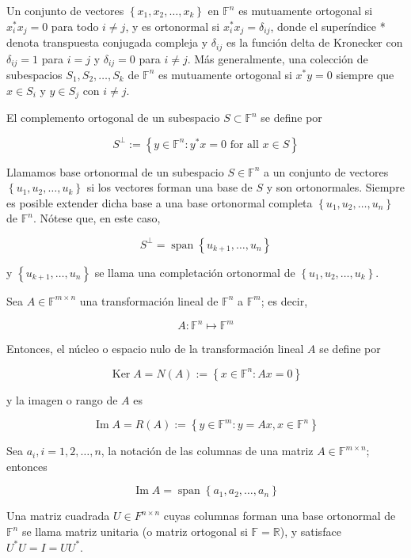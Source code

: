 \documentclass[11pt]{article}
\begin{document}
Un conjunto de vectores $\left\{x_{1}, x_{2}, \ldots, x_{k}\right\}$ en $\mathbb{F}^{n}$ es mutuamente ortogonal si $x_{i}^{*} x_{j}=0$ para todo $i \neq j$, y es ortonormal si $x_{i}^{*} x_{j}=\delta_{i j}$, donde el superíndice * denota transpuesta conjugada compleja y $\delta_{i j}$ es la función delta de Kronecker con $\delta_{i j}=1$ para $i=j$ y $\delta_{i j}=0$ para $i \neq j$. Más generalmente, una colección de subespacios $S_{1}, S_{2}, \ldots, S_{k}$ de $\mathbb{F}^{n}$ es mutuamente ortogonal si $x^{*} y=0$ siempre que $x \in S_{i}$ y $y \in S_{j}$ con $i \neq j$.

El complemento ortogonal de un subespacio $S \subset \mathbb{F}^{n}$ se define por

$$
S^{\perp}:=\left\{y \in \mathbb{F}^{n}: y^{*} x=0 \text { for all } x \in S\right\}
$$

Llamamos base ortonormal de un subespacio $S \in \mathbb{F}^{n}$ a un conjunto de vectores $\left\{u_{1}, u_{2}, \ldots, u_{k}\right\}$ si los vectores forman una base de $S$ y son ortonormales. Siempre es posible extender dicha base a una base ortonormal completa $\left\{u_{1}, u_{2}, \ldots, u_{n}\right\}$ de $\mathbb{F}^{n}$. Nótese que, en este caso,

$$
S^{\perp}=\operatorname{span}\left\{u_{k+1}, \ldots, u_{n}\right\}
$$

y $\left\{u_{k+1}, \ldots, u_{n}\right\}$ se llama una completación ortonormal de $\left\{u_{1}, u_{2}, \ldots, u_{k}\right\}$.

Sea $A \in \mathbb{F}^{m \times n}$ una transformación lineal de $\mathbb{F}^{n}$ a $\mathbb{F}^{m}$; es decir,

$$
A: \mathbb{F}^{n} \longmapsto \mathbb{F}^{m}
$$

Entonces, el núcleo o espacio nulo de la transformación lineal $A$ se define por

$$
\operatorname{Ker} A=N(A):=\left\{x \in \mathbb{F}^{n}: A x=0\right\}
$$

y la imagen o rango de $A$ es

$$
\operatorname{Im} A=R(A):=\left\{y \in \mathbb{F}^{m}: y=A x, x \in \mathbb{F}^{n}\right\}
$$

Sea $a_{i}, i=1,2, \ldots, n$, la notación de las columnas de una matriz $A \in \mathbb{F}^{m \times n}$; entonces

$$
\operatorname{Im} A=\operatorname{span}\left\{a_{1}, a_{2}, \ldots, a_{n}\right\}
$$

Una matriz cuadrada $U \in F^{n \times n}$ cuyas columnas forman una base ortonormal de $\mathbb{F}^{n}$ se llama matriz unitaria (o matriz ortogonal si $\mathbb{F}=\mathbb{R}$), y satisface $U^{*} U=I=U U^{*}$.
\end{document}
